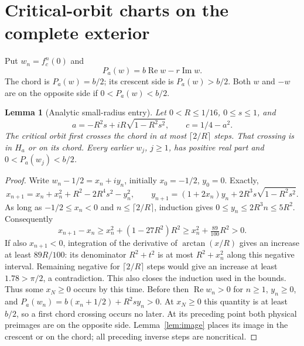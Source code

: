\documentclass[11pt]{article}
\newtheorem{lemma}[theorem]{Lemma}
\newcommand{\re}{\operatorname{Re}}
\newcommand{\im}{\operatorname{Im}}
\begin{document}
\section{Critical-orbit charts on the complete exterior}
Put $w_n=f_c^n(0)$ and
\[
 P_a(w)=b\re w-r\im w.
\]
The chord is $P_a(w)=b/2$; its crescent side is $P_a(w)>b/2$.
Both $w$ and $-w$ are on the opposite side if $0<P_a(w)<b/2$.

\begin{lemma}[Analytic small-radius entry]\label{lem:tail}
Let $0<R\le1/16$, $0\le s\le1$, and
\[
 a=-R^2s+iR\sqrt{1-R^2s^2},\qquad c=1/4-a^2.
\]
The critical orbit first crosses the chord in at most $\lceil2/R\rceil$
steps. That crossing is in $H_a$ or on its chord. Every earlier $w_j$,
$j\ge1$, has positive real part and $0<P_a(w_j)<b/2$.
\end{lemma}
\begin{proof}
Write $w_n-1/2=x_n+iy_n$, initially $x_0=-1/2$, $y_0=0$. Exactly,
\[
 x_{n+1}=x_n+x_n^2+R^2-2R^4s^2-y_n^2,\qquad
 y_{n+1}=(1+2x_n)y_n+2R^3s\sqrt{1-R^2s^2}.
\]
As long as $-1/2\le x_n<0$ and $n\le\lceil2/R\rceil$, induction gives
$0\le y_n\le2R^3n\le5R^2$. Consequently
\[
 x_{n+1}-x_n\ge x_n^2+(1-27R^2)R^2
 \ge x_n^2+\tfrac{89}{100}R^2>0.
\]
If also $x_{n+1}<0$, integration of the derivative of $\arctan(x/R)$
gives an increase at least $89R/100$: its denominator $R^2+t^2$ is
at most $R^2+x_n^2$ along this negative interval. Remaining negative for
$\lceil2/R\rceil$ steps would give an increase at least $1.78>\pi/2$,
a contradiction. This also closes the induction used in the bounds.
Thus some $x_N\ge0$ occurs by this time. Before then $\re w_n>0$ for
$n\ge1$, $y_n\ge0$, and
$P_a(w_n)=b(x_n+1/2)+R^2sy_n>0$.
At $x_N\ge0$ this quantity is at least $b/2$, so a first chord crossing
occurs no later. At its preceding point both physical preimages are on
the opposite side. Lemma~\ref{lem:image} places its image in the crescent
or on the chord; all preceding inverse steps are noncritical.
\end{proof}
\end{document}
